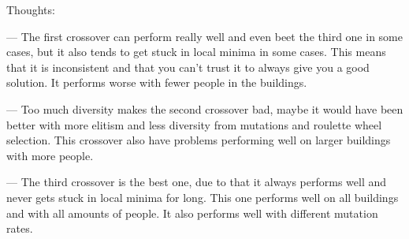 Thoughts:

— The first crossover can perform really well and even beet the third one in some cases, but it also tends to get stuck in local minima in some cases. This means that it is inconsistent and that you can't trust it to always give you a good solution. It performs worse with fewer people in the buildings.

— Too much diversity makes the second crossover bad, maybe it would have been better with more elitism and less diversity from mutations and roulette wheel selection. This crossover also have problems performing well on larger buildings with more people.

— The third crossover is the best one, due to that it always performs well and never gets stuck in local minima for long. This one performs well on all buildings and with all amounts of people. It also performs well with different mutation rates.